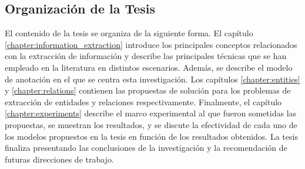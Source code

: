 \subsection*{Organización de la Tesis}

El contenido de la tesis se organiza de la siguiente forma.
El capítulo \ref{chapter:information_extraction} introduce los principales conceptos relacionados con la extracción de información y describe las principales técnicas que se han empleado en la literatura en distintos escenarios.
Además, se describe el modelo de anotación en el que se centra esta investigación.
Los capítulos \ref{chapter:entities} y \ref{chapter:relations} contienen las propuestas de solución para los problemas de extracción de entidades y relaciones respectivamente.
Finalmente, el capítulo \ref{chapter:experiments} describe el marco experimental al que fueron sometidas las propuestas, se muestran los resultados, y se discute la efectividad de cada uno de los modelos propuestos en la tesis en función de los resultados obtenidos.
La tesis finaliza presentando las conclusiones de la investigación y la recomendación de futuras direcciones de trabajo.

